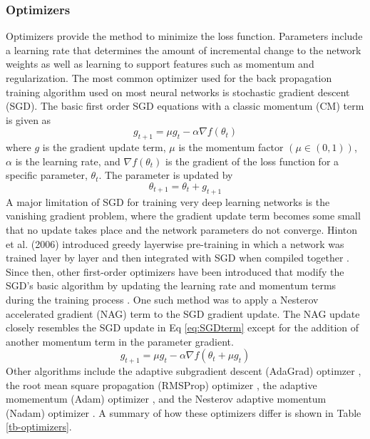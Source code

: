 \documentclass[preprint,12pt,a4paper,authoryear]{elsarticle}
\begin{document}
\begin{linenumbers}
\subsubsection{Optimizers}
Optimizers provide the method to minimize the loss function. Parameters include a learning rate that determines the amount of incremental change to the network weights as well as learning to support features such as momentum and regularization. The most common optimizer used for the back propagation training algorithm used on most neural networks is stochastic gradient descent (SGD). The basic first order SGD equations with a classic momentum (CM) term is given as
%
\begin{equation}
\label{eq:SGDterm}
g_{t+1} = \mu g_{t} - \alpha \nabla f (\theta_{t})
\end{equation}
%
\noindent
where $g$ is the gradient update term, $\mu$ is the momentum factor $(\mu \in (0,1))$, $\alpha$ is the learning rate, and $\nabla f (\theta_{t})$ is the gradient of the loss function for a specific parameter, $\theta_{t}$. The parameter is updated by
%
\begin{equation}
\label{eq:SGDupdate}
\theta_{t+1} = \theta_{t} + g_{t+1}
\end{equation}
%
A major limitation of SGD for training very deep learning networks is the vanishing gradient problem, where the gradient update term becomes some small that no update takes place and the network parameters do not converge. Hinton et al. (2006) introduced greedy layerwise pre-training in which a network was trained layer by layer and then integrated with SGD when compiled together \citep{Hinton2006}. Since then, other first-order optimizers have been introduced that modify the SGD's basic algorithm by updating the learning rate and momentum terms during the training process \citep{Sutskever2013}.  One such method was to apply a Nesterov accelerated gradient (NAG) \citep{Nesterov1983} term to the SGD gradient update. The NAG update closely resembles the SGD update in Eq \ref{eq:SGDterm} except for the addition of another momentum term in the parameter gradient.
%
\begin{equation}
\label{eq:SGD-NAG}
g_{t+1} = \mu g_{t} - \alpha \nabla f (\theta_{t} + \mu g_{t})
\end{equation}
%
Other algorithms include the adaptive subgradient descent (AdaGrad) optimzer \citep{Duchi2011}, the root mean square propagation (RMSProp) optimizer \citep{Tieleman2012}, the adaptive momementum (Adam) optimizer \citep{Kingma2014}, and the Nesterov adaptive momentum (Nadam) optimizer \citep{Dozat2016}. A summary of how these optimizers differ is shown in Table \ref{tb-optimizers}.
%
\end{linenumbers}
\end{document}
